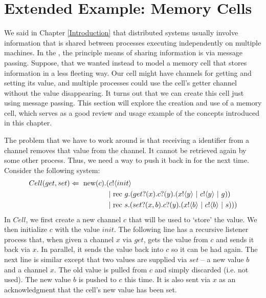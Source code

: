 \section{Extended Example: Memory Cells}\label{secmemcells}
	We said in Chapter \ref{Introduction} that distributed systems usually involve information that is shared between processes executing independently on multiple machines.  
In the \picalc, the principle means of sharing information is via message passing.  
Suppose, that we wanted instead to model a memory cell that stores information in a less fleeting way.  
Our cell might have channels for getting and setting its value, and multiple processes could use the cell's getter channel without the value disappearing.  
It turns out that we can create this cell just using message passing.  
This section will explore the creation and use of a memory cell, which serves as a good review and usage example of the concepts introduced in this chapter.

	The problem that we have to work around is that receiving a identifier from a channel removes that value from the channel.  
It cannot be retrieved again by some other process.  
Thus, we need a way to push it back in for the next time.  
Consider the following system:
	\begin{equation}\begin{split}
		Cell(get,set) \Leftarrow\  \text{new}({c}). & ({c}!\langle{init}\rangle \\
		& \ |\ \text{rec }{g}.({get}?({x}).{c}?({y}).({x}!\langle{y}\rangle\ |\  {c}!\langle{y}\rangle\ |\  g))\\
		&\ |\ \text{rec }{s}.({set}?({x,b}).{c}?({y}).({x}!\langle{b}\rangle\ |\ {c}!\langle{b}\rangle\ |\  s)))
	\end{split}\end{equation}
	In $Cell$, we first create a new channel $c$ that will be used to `store' the value.  
We then initialize $c$ with the value $init$.  
The following line has a recursive listener process that, when given a channel $x$ via $get$, gets the value from $c$ and sends it back via $x$.  
In parallel, it sends the value back into $c$ so it can be had again.  
The next line is similar except that two values are supplied via $set$ -- a new value $b$ and a channel $x$.  
The old value is pulled from $c$ and simply discarded (i.e. not used).  
The new value $b$ is pushed to $c$ this time.  
It is also sent via $x$ as an acknowledgment that the cell's new value has been set.
	 

